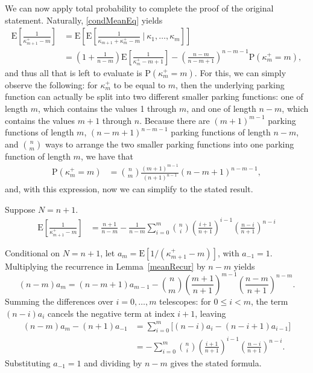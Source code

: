 \documentclass[stsy,dblanonrev]{amers/INFORMS-STSY-Template-26-02-2026/informs4}
\newcommand{\E}[1]{{\mathrm{E}\left[#1\right]}}
\newcommand{\PP}[1]{\mathrm{P}\left(#1\right)}
\begin{document}
We can now apply total probability to complete the proof of the original statement. Naturally, \eqref{condMeanEq} yields
\begin{align}
\E{\frac{1}{\kappa_{m+1}^+ - m} }
&=
\E{\E{\frac{1}{\kappa_{m+1} + \kappa_m^+ - m} ~\bigg|~ \kappa_1, \dots, \kappa_m}}
\\
&=
\left(1 + \frac{1}{n-m}\right)\E{\frac{1}{\kappa_m^+ - m + 1}}
-
\left(\frac{n-m}{n-m+1}\right)^{n-m-1}\PP{\kappa_m^+ = m}
,
\end{align}
and thus all that is left to evaluate is $\PP{\kappa_m^+ = m}$. For this, we can simply observe the following: for $\kappa_m^+$ to be equal to $m$, then the underlying parking function can actually be split into two different smaller parking functions: one of length $m$, which contains the values 1 through $m$, and one of length $n - m$, which contains the values $m+1$ through $n$. Because there are $(m+1)^{m-1}$ parking functions of length $m$, $(n-m+1)^{n-m-1}$ parking functions of length $n-m$, and ${n \choose m}$ ways to arrange the two  smaller parking functions into one parking function of length $m$, we have that
\begin{align}
\PP{\kappa_m^+ = m}
&=
{n \choose m}\frac{(m+1)^{m-1}}{(n+1)^{n-1}}(n-m+1)^{n-m-1}
,
\end{align}
and, with this expression, now we can simplify to the stated result.
\hfill\Halmos\endproof

\begin{corollary}\label{meanRecurSolve}
Suppose $N = n + 1$.
\begin{align}
\E{\frac{1}{\kappa_{m+1}^+ - m} }
&=
\frac{n+1}{n-m}
-
\frac{1}{n-m}
\sum_{i=0}^m
{n \choose i}
\left(\frac{i+1}{n+1}\right)^{i-1}
\left(\frac{n-i}{n+1}\right)^{n-i}
\end{align}
\end{corollary}
\begingroup\color{blue}
Conditional on $N=n+1$, let $a_m=\E{1/(\kappa_{m+1}^+-m)}$, with $a_{-1}=1$. Multiplying the recurrence in Lemma~\ref{meanRecur} by $n-m$ yields
\begin{equation*}
(n-m)a_m=(n-m+1)a_{m-1}
-\binom{n}{m}
\left(\frac{m+1}{n+1}\right)^{m-1}
\left(\frac{n-m}{n+1}\right)^{n-m}.
\end{equation*}
Summing the differences over $i=0,\ldots,m$ telescopes: for $0\leq i<m$, the term $(n-i)a_i$ cancels the negative term at index $i+1$, leaving
\begin{align*}
(n-m)a_m-(n+1)a_{-1}
&=\sum_{i=0}^{m}\bigl[(n-i)a_i-(n-i+1)a_{i-1}\bigr]\\
&=-\sum_{i=0}^{m}\binom{n}{i}
\left(\frac{i+1}{n+1}\right)^{i-1}
\left(\frac{n-i}{n+1}\right)^{n-i}.
\end{align*}
Substituting $a_{-1}=1$ and dividing by $n-m$ gives the stated formula.
\endgroup
\hfill\Halmos\endproof
\end{document}
